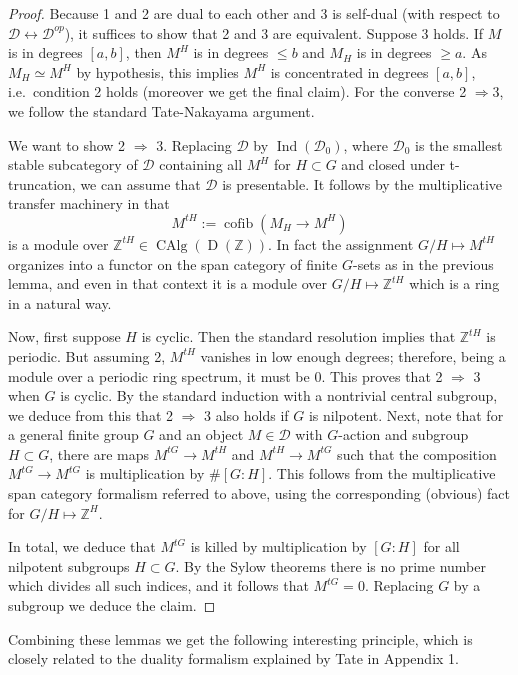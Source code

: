 \documentclass[12pt]{article}
\theoremstyle{definition}
\newcommand{\on}{\operatorname}
\newcommand{\mc}{\mathcal}
\newcommand{\mbb}{\mathbb}
\begin{document}
\begin{proof}
Because 1 and 2 are dual to each other and 3 is self-dual (with respect to $\mc{D}\leftrightarrow\mc{D}^{op}$), it suffices to show that 2 and 3 are equivalent.  Suppose 3 holds.  If $M$ is in degrees $[a,b]$, then $M^H$ is in degrees $\leq b$ and $M_H$ is in degrees $\geq a$.  As $M_H\simeq M^H$ by hypothesis, this implies $M^H$ is concentrated in degrees $[a,b]$, i.e.\ condition 2 holds (moreover we get the final claim).  For the converse 2 $\Rightarrow 3$, we follow the standard Tate-Nakayama argument.

We want to show 2 $\Rightarrow$ 3.  Replacing $\mc{D}$ by $\on{Ind}(\mc{D}_0)$, where $\mc{D}_0$ is the smallest stable subcategory of $\mc{D}$ containing all $M^H$ for $H\subset G$ and closed under t-truncation, we can assume that $\mc{D}$ is presentable.  It follows by the multiplicative transfer machinery in \cite{cm2} that
$$M^{tH}:= \on{cofib}(M_H \to M^H)$$
is a module over $\mbb{Z}^{tH}\in \on{CAlg}(\on{D}(\mbb{Z}))$.  In fact the assignment $G/H \mapsto M^{tH}$ organizes into a functor on the span category of finite $G$-sets as in the previous lemma, and even in that context it is a module over $G/H\mapsto \mbb{Z}^{tH}$ which is a ring in a natural way.

Now, first suppose $H$ is cyclic.  Then the standard resolution implies that $\mbb{Z}^{tH}$ is periodic.  But assuming 2, $M^{tH}$ vanishes in low enough degrees; therefore, being a module over a periodic ring spectrum, it must be $0$.  This proves that 2 $\Rightarrow$ 3 when $G$ is cyclic.  By the standard induction with a nontrivial central subgroup, we deduce from this that 2 $\Rightarrow$ 3 also holds if $G$ is nilpotent.  Next, note that for a general finite group $G$ and an object $M\in\mc{D}$ with $G$-action and subgroup $H\subset G$, there are maps $M^{tG} \to M^{tH}$ and $M^{tH} \to M^{tG}$ such that the composition $M^{tG} \to M^{tG}$ is multiplication by $\#[G:H]$.  This follows from the multiplicative span category formalism referred to above, using the corresponding (obvious) fact for $G/H \mapsto \mbb{Z}^H$.

In total, we deduce that $M^{tG}$ is killed by multiplication by $[G:H]$ for all nilpotent subgroups $H\subset G$.  By the Sylow theorems there is no prime number which divides all such indices, and it follows that $M^{tG}=0$.  Replacing $G$ by a subgroup we deduce the claim.
\end{proof}

Combining these lemmas we get the following interesting principle, which is closely related to the duality formalism explained by Tate in \cite{galcoh} Appendix 1.
\end{document}
